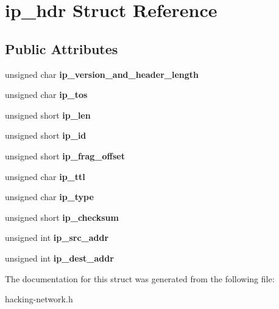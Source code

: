 \hypertarget{structip__hdr}{}\section{ip\+\_\+hdr Struct Reference}
\label{structip__hdr}
\subsection*{Public Attributes}
\begin{DoxyCompactItemize}
\item 
unsigned char {\bfseries ip\+\_\+version\+\_\+and\+\_\+header\+\_\+length}\hypertarget{structip__hdr_ab284c6984e507834968090a46de21f1a}{}\label{structip__hdr_ab284c6984e507834968090a46de21f1a}

\item 
unsigned char {\bfseries ip\+\_\+tos}\hypertarget{structip__hdr_af50662ba23d9f6c2b0d00532e828d39d}{}\label{structip__hdr_af50662ba23d9f6c2b0d00532e828d39d}

\item 
unsigned short {\bfseries ip\+\_\+len}\hypertarget{structip__hdr_ac902256d48b81f3226404c7d32a01569}{}\label{structip__hdr_ac902256d48b81f3226404c7d32a01569}

\item 
unsigned short {\bfseries ip\+\_\+id}\hypertarget{structip__hdr_a4eda327cff29c1dddb471b5a9d07580b}{}\label{structip__hdr_a4eda327cff29c1dddb471b5a9d07580b}

\item 
unsigned short {\bfseries ip\+\_\+frag\+\_\+offset}\hypertarget{structip__hdr_a7c4b79d751553f232eefe6c5d54a3af3}{}\label{structip__hdr_a7c4b79d751553f232eefe6c5d54a3af3}

\item 
unsigned char {\bfseries ip\+\_\+ttl}\hypertarget{structip__hdr_af5bbc5a58545da2185f62dfc171bec7b}{}\label{structip__hdr_af5bbc5a58545da2185f62dfc171bec7b}

\item 
unsigned char {\bfseries ip\+\_\+type}\hypertarget{structip__hdr_a786dba97704c69307d37092b8b0dd880}{}\label{structip__hdr_a786dba97704c69307d37092b8b0dd880}

\item 
unsigned short {\bfseries ip\+\_\+checksum}\hypertarget{structip__hdr_abc1ee3f70a6d9b45823b34db2725b6f6}{}\label{structip__hdr_abc1ee3f70a6d9b45823b34db2725b6f6}

\item 
unsigned int {\bfseries ip\+\_\+src\+\_\+addr}\hypertarget{structip__hdr_adfce267129d461c1d2ac9a1bc67abd89}{}\label{structip__hdr_adfce267129d461c1d2ac9a1bc67abd89}

\item 
unsigned int {\bfseries ip\+\_\+dest\+\_\+addr}\hypertarget{structip__hdr_afacfc2edd2bb2af45b8f505aaf6dea6c}{}\label{structip__hdr_afacfc2edd2bb2af45b8f505aaf6dea6c}

\end{DoxyCompactItemize}


The documentation for this struct was generated from the following file\+:\begin{DoxyCompactItemize}
\item 
hacking-\/network.\+h\end{DoxyCompactItemize}
